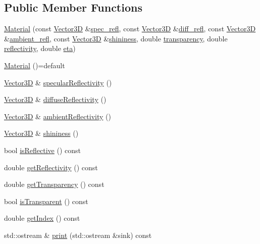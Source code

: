 \subsection*{Public Member Functions}
\begin{DoxyCompactItemize}
\item 
\hyperlink{classMaterial_a4e63e7e70f9a2cc55801f798d88f5c14}{Material} (const \hyperlink{classVector3D}{Vector3D} \&\hyperlink{classMaterial_a8b1858703e3298ba1cc705684939f953}{spec\+\_\+refl}, const \hyperlink{classVector3D}{Vector3D} \&\hyperlink{classMaterial_af53038fbe5bbe5d1a9801aabc97543a5}{diff\+\_\+refl}, const \hyperlink{classVector3D}{Vector3D} \&\hyperlink{classMaterial_a40002cba7c7049feb2bddaf57ae96ba4}{ambient\+\_\+refl}, const \hyperlink{classVector3D}{Vector3D} \&\hyperlink{classMaterial_abd4573ad64b9e4ebc7d3a365e2078d69}{shininess}, double \hyperlink{classMaterial_a02abe03436775e128e04e1c737d34067}{transparency}, double \hyperlink{classMaterial_a050f60e6002271e571c4e5afc4b097b5}{reflectivity}, double \hyperlink{classMaterial_a62e8368c76c975790315b16d97558c26}{eta})
\item 
\hyperlink{classMaterial_a6059ec72855855b11672ff25962e9336}{Material} ()=default
\item 
\hyperlink{classVector3D}{Vector3D} \& \hyperlink{classMaterial_a6f008b17f377859d3c23e7fc60793b58}{specular\+Reflectivity} ()
\item 
\hyperlink{classVector3D}{Vector3D} \& \hyperlink{classMaterial_a9186602866ab630c193bf69dfbf9ca2b}{diffuse\+Reflectivity} ()
\item 
\hyperlink{classVector3D}{Vector3D} \& \hyperlink{classMaterial_a3ae3038aaad0e21ebd7651d8210028bc}{ambient\+Reflectivity} ()
\item 
\hyperlink{classVector3D}{Vector3D} \& \hyperlink{classMaterial_abd4573ad64b9e4ebc7d3a365e2078d69}{shininess} ()
\item 
bool \hyperlink{classMaterial_a26895d4c00d1638facfa3d8998583a4c}{is\+Reflective} () const 
\item 
double \hyperlink{classMaterial_ae16a99e32e2c7cf394b68aa5d2ad207a}{get\+Reflectivity} () const 
\item 
double \hyperlink{classMaterial_adf2e9e4aedf7a4474fd27c195aaa5fc9}{get\+Transparency} () const 
\item 
bool \hyperlink{classMaterial_a7bf72c0ab59de6b7657475a0dcf0d819}{is\+Transparent} () const 
\item 
double \hyperlink{classMaterial_a428130c7697062cddb3e1b6d78f99c81}{get\+Index} () const 
\item 
std\+::ostream \& \hyperlink{classMaterial_a9b45a3e49fbc8e4eb7ba30839ed6d593}{print} (std\+::ostream \&sink) const 
\end{DoxyCompactItemize}
